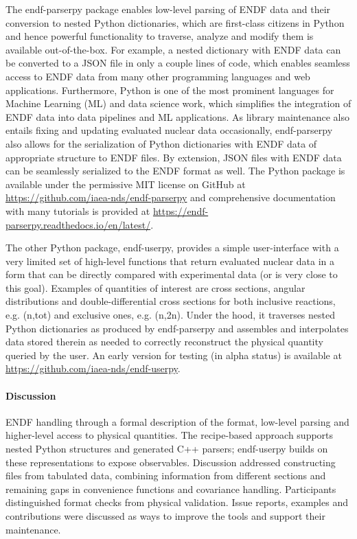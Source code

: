 The endf-parserpy package enables low-level parsing of ENDF data and their conversion to nested Python dictionaries, which are first-class citizens in Python and hence powerful functionality to traverse, analyze and modify them is available out-of-the-box. For example, a nested dictionary with ENDF data can be converted to a JSON file in only a couple lines of code, which enables seamless access to ENDF data from many other programming languages and web applications. Furthermore, Python is one of the most prominent languages for Machine Learning (ML) and data science work, which simplifies the integration of ENDF data into data pipelines and ML applications.
As library maintenance also entails fixing and updating evaluated nuclear data occasionally, endf-parserpy also allows for the serialization of Python dictionaries with ENDF data of appropriate structure to ENDF files. By extension, JSON files with ENDF data can be seamlessly serialized to the ENDF format as well. The Python package is available under the permissive MIT license on GitHub at \url{https://github.com/iaea-nds/endf-parserpy} and comprehensive documentation with many tutorials is provided at \url{https://endf-parserpy.readthedocs.io/en/latest/}.

The other Python package, endf-userpy, provides a simple user-interface with a very limited set of high-level functions that return evaluated nuclear data in a form that can be directly compared with experimental data (or is very close to this goal). Examples of quantities of interest are cross sections, angular distributions and double-differential cross sections for both inclusive reactions, e.g. (n,tot) and exclusive ones, e.g. (n,2n). Under the hood, it traverses nested Python dictionaries as produced by endf-parserpy and assembles and interpolates data stored therein as needed to correctly reconstruct the physical quantity queried by the user. An early version for testing (in alpha status) is available at \url{https://github.com/iaea-nds/endf-userpy}. 


\paragraph{Discussion}

ENDF handling through a formal description of the format, low-level parsing and higher-level access to physical quantities. The recipe-based approach supports nested Python structures and generated C++ parsers; endf-userpy builds on these representations to expose observables. Discussion addressed constructing files from tabulated data, combining information from different sections and remaining gaps in convenience functions and covariance handling. Participants distinguished format checks from physical validation. Issue reports, examples and contributions were discussed as ways to improve the tools and support their maintenance. 
